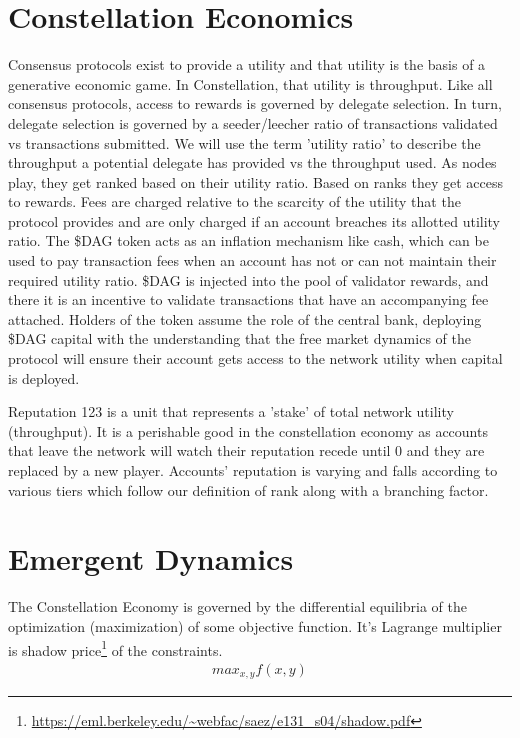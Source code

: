 \documentclass{article}
\begin{document}
\section{Constellation Economics}
Consensus protocols exist to provide a utility and that utility is the basis of a generative economic game. In Constellation, that utility is throughput. Like all consensus protocols, access to rewards is governed by delegate selection. In turn, delegate selection is governed by a seeder/leecher ratio of transactions validated vs transactions submitted. We will use the term 'utility ratio' to describe the throughput a potential delegate has provided vs the throughput used. As nodes play, they get ranked based on their utility ratio. Based on ranks they get access to rewards. Fees are charged relative to the scarcity of the utility that the protocol provides and are only charged if an account breaches its allotted utility ratio. The \$DAG token acts as an inflation mechanism like cash, which can be used to pay transaction fees when an account has not or can not maintain their required utility ratio. \$DAG is injected into the pool of validator rewards, and there it is an incentive to validate transactions that have an accompanying fee attached. Holders of the token assume the role of the central bank, deploying \$DAG capital with the understanding that the free market dynamics of the protocol will ensure their account gets access to the network utility when capital is deployed. 

Reputation 123 is a unit that represents a 'stake' of total network utility (throughput). It is a perishable good in the constellation economy as accounts that leave the network will watch their reputation recede until 0 and they are replaced by a new player. Accounts' reputation is varying and falls according to various tiers which follow our definition of rank along with a branching factor.

\section{Emergent Dynamics}
The Constellation Economy is governed by the differential equilibria of the optimization (maximization) of some objective function. It's Lagrange multiplier is shadow price\footnote{\url{https://eml.berkeley.edu/~webfac/saez/e131_s04/shadow.pdf}} of the constraints.
\begin{equation} \label{eq1}
\begin{split}
max_{x, y} f(x, y)
\end{split}
\end{equation}
\end{document}
